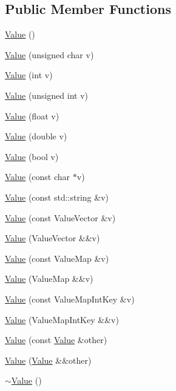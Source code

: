 \subsection*{Public Member Functions}
\begin{DoxyCompactItemize}
\item 
\hyperlink{classValue_abc2a5a2e6484fac66dae2539cc955667}{Value} ()
\item 
\hyperlink{classValue_aabe730986b0548c9de3e52ea086e6b8c}{Value} (unsigned char v)
\item 
\hyperlink{classValue_ad66a1aec17bd011f542d70e8dcf85739}{Value} (int v)
\item 
\hyperlink{classValue_aca420574da40e0503bbb5b3c124a19b4}{Value} (unsigned int v)
\item 
\hyperlink{classValue_a522f9e03113fc05bab847df24c68c648}{Value} (float v)
\item 
\hyperlink{classValue_ac23a80a895f9777f1c7f61f62483d632}{Value} (double v)
\item 
\hyperlink{classValue_acbcf978c0d65b9b506277cc11bc49c8e}{Value} (bool v)
\item 
\hyperlink{classValue_a7db8cffa4a718b7d80ddd6a9a7ce39db}{Value} (const char $\ast$v)
\item 
\hyperlink{classValue_a2eba631d78407365a6c900aac4a59fc1}{Value} (const std\+::string \&v)
\item 
\hyperlink{classValue_a4502e594309480551ac7a2b883783fbb}{Value} (const Value\+Vector \&v)
\item 
\hyperlink{classValue_ae0da25f68aae6575f644cb16fb87eab8}{Value} (Value\+Vector \&\&v)
\item 
\hyperlink{classValue_a7d97b1a3f68d81c2eda9ca546ff6ce82}{Value} (const Value\+Map \&v)
\item 
\hyperlink{classValue_a8b38ee46eed8e2ea0426999b932f4cd3}{Value} (Value\+Map \&\&v)
\item 
\hyperlink{classValue_a28899b86170bb33fce537aeeed94d582}{Value} (const Value\+Map\+Int\+Key \&v)
\item 
\hyperlink{classValue_acbc7dacfe7f92f9272c055e681e0ee61}{Value} (Value\+Map\+Int\+Key \&\&v)
\item 
\hyperlink{classValue_acc427785c9007f762772d1dbe7535295}{Value} (const \hyperlink{classValue}{Value} \&other)
\item 
\hyperlink{classValue_a787430959f5652852d4ea01daa512341}{Value} (\hyperlink{classValue}{Value} \&\&other)
\item 
\hyperlink{classValue_a3a578f458da8a4ab67052dba0f7bffdd}{$\sim$\+Value} ()

\end{DoxyCompactItemize}

